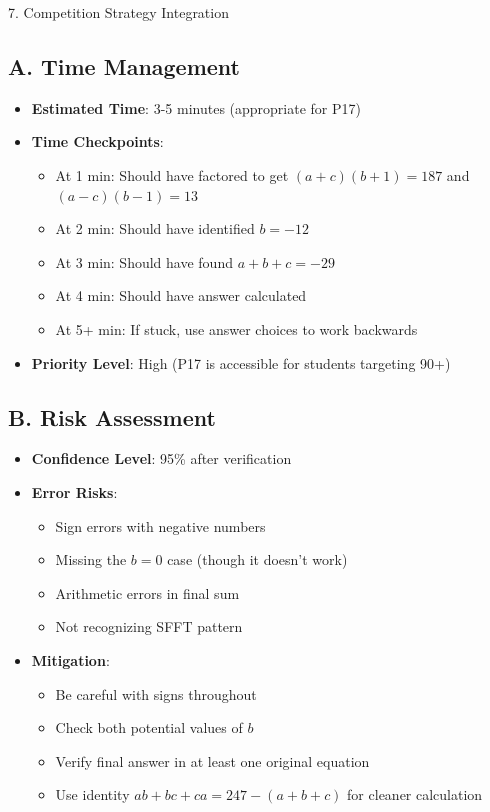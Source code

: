 \documentclass[12pt]{article}
\begin{document}
\begin{competitionbox}{7. Competition Strategy Integration}

\subsection*{A. Time Management}
\begin{itemize}[leftmargin=*]
    \item \textbf{Estimated Time}: 3-5 minutes (appropriate for P17)
    \item \textbf{Time Checkpoints}:
    \begin{itemize}
        \item At 1 min: Should have factored to get $(a+c)(b+1) = 187$ and $(a-c)(b-1) = 13$
        \item At 2 min: Should have identified $b = -12$
        \item At 3 min: Should have found $a+b+c = -29$
        \item At 4 min: Should have answer calculated
        \item At 5+ min: If stuck, use answer choices to work backwards
    \end{itemize}
    \item \textbf{Priority Level}: High (P17 is accessible for students targeting 90+)
\end{itemize}

\subsection*{B. Risk Assessment}
\begin{itemize}[leftmargin=*]
    \item \textbf{Confidence Level}: 95\% after verification
    
    \item \textbf{Error Risks}: 
    \begin{itemize}
        \item Sign errors with negative numbers
        \item Missing the $b = 0$ case (though it doesn't work)
        \item Arithmetic errors in final sum
        \item Not recognizing SFFT pattern
    \end{itemize}
    
    \item \textbf{Mitigation}:
    \begin{itemize}
        \item Be careful with signs throughout
        \item Check both potential values of $b$
        \item Verify final answer in at least one original equation
        \item Use identity $ab+bc+ca = 247 - (a+b+c)$ for cleaner calculation
    \end{itemize}
    

\end{itemize}
\end{competitionbox}
\end{document}

